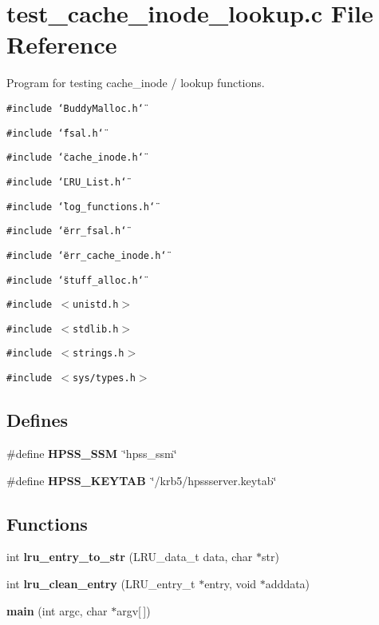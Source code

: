 \section{test\_\-cache\_\-inode\_\-lookup.c File Reference}
\label{test__cache__inode__lookup_8c}
Program for testing cache\_\-inode / lookup functions.  


{\tt \#include \char`\"{}BuddyMalloc.h\char`\"{}}\par
{\tt \#include \char`\"{}fsal.h\char`\"{}}\par
{\tt \#include \char`\"{}cache\_\-inode.h\char`\"{}}\par
{\tt \#include \char`\"{}LRU\_\-List.h\char`\"{}}\par
{\tt \#include \char`\"{}log\_\-functions.h\char`\"{}}\par
{\tt \#include \char`\"{}err\_\-fsal.h\char`\"{}}\par
{\tt \#include \char`\"{}err\_\-cache\_\-inode.h\char`\"{}}\par
{\tt \#include \char`\"{}stuff\_\-alloc.h\char`\"{}}\par
{\tt \#include $<$unistd.h$>$}\par
{\tt \#include $<$stdlib.h$>$}\par
{\tt \#include $<$strings.h$>$}\par
{\tt \#include $<$sys/types.h$>$}\par
\subsection*{Defines}
\begin{CompactItemize}
\item 
\#define {\bf HPSS\_\-SSM}~\char`\"{}hpss\_\-ssm\char`\"{}
\item 
\#define {\bf HPSS\_\-KEYTAB}~\char`\"{}/krb5/hpssserver.keytab\char`\"{}
\end{CompactItemize}
\subsection*{Functions}
\begin{CompactItemize}
\item 
int {\bf lru\_\-entry\_\-to\_\-str} (LRU\_\-data\_\-t data, char $\ast$str)
\item 
int {\bf lru\_\-clean\_\-entry} (LRU\_\-entry\_\-t $\ast$entry, void $\ast$adddata)
\item 
{\bf main} (int argc, char $\ast$argv[$\,$])
\end{CompactItemize}


